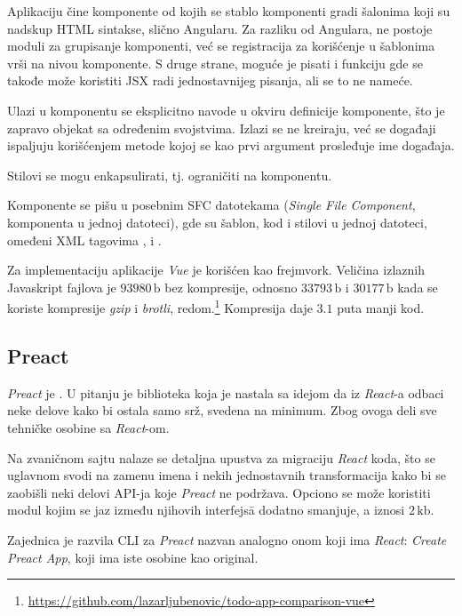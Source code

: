 Aplikaciju čine komponente od kojih se stablo komponenti gradi šalonima koji su nadskup HTML sintakse, slično Angularu.
Za razliku od Angulara, ne postoje moduli za grupisanje komponenti, već se registracija za korišćenje u šablonima vrši na nivou komponente.
S druge strane, moguće je pisati i  funkciju gde se takođe može koristiti JSX radi jednostavnijeg pisanja, ali se to ne nameće.

Ulazi u komponentu se eksplicitno navode u okviru definicije komponente, što je zapravo objekat sa određenim svojstvima.
Izlazi se ne kreiraju, već se događaji ispaljuju korišćenjem metode  kojoj se kao prvi argument prosleđuje ime događaja.

Stilovi se mogu enkapsulirati, tj. ograničiti na komponentu.

Komponente se pišu u posebnim SFC datotekama (\textsl{Single File Component}, komponenta u jednoj datoteci), gde su šablon, kod i stilovi u jednoj datoteci, omeđeni XML tagovima ,  i .

Za implementaciju  aplikacije \textsl{Vue} je korišćen kao frejmvork.
Veličina izlaznih Javaskript fajlova je $93980\,\mathrm{b}$ bez kompresije, odnosno $33793\,\mathrm{b}$ i $30177\,\mathrm{b}$ kada se koriste kompresije \textsl{gzip} i \textsl{brotli}, redom.\footnote{\url{https://github.com/lazarljubenovic/todo-app-comparison-vue}} Kompresija daje $3.1$ puta manji kod.

\subsection{Preact}

\textsl{Preact} je .
U pitanju je biblioteka koja je nastala sa idejom da iz \textsl{React}-a odbaci neke delove kako bi ostala samo srž, svedena na minimum.
Zbog ovoga deli sve tehničke osobine sa \textsl{React}-om.

Na zvaničnom sajtu nalaze se detaljna upustva za migraciju \textsl{React} koda, što se uglavnom svodi na zamenu imena i nekih jednostavnih transformacija kako bi se zaobišli neki delovi API-ja koje \textsl{Preact} ne podržava.
Opciono se može koristiti modul  kojim se jaz između njihovih interfejs\=a dodatno smanjuje, a iznosi $2\,\mathrm{kb}$.

Zajednica je razvila CLI za \textsl{Preact} nazvan analogno onom koji ima \textsl{React}: \textsl{Create Preact App}, koji ima iste osobine kao original.

